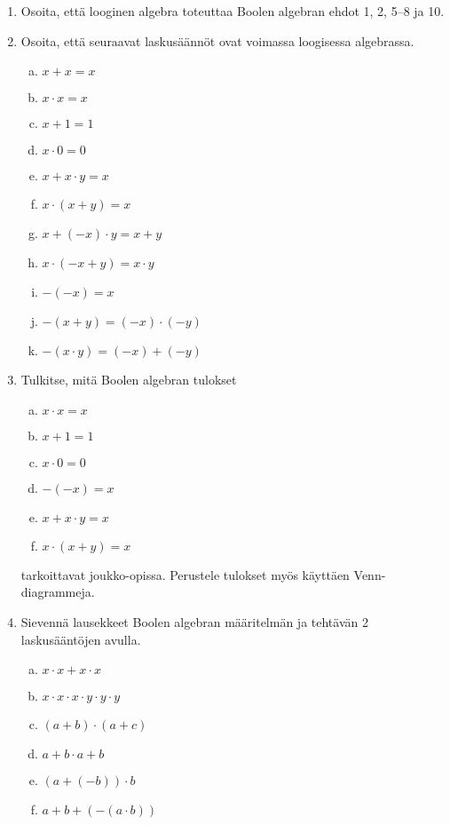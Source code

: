 \begin{enumerate}

\item Osoita, että looginen algebra toteuttaa Boolen algebran ehdot 1, 2, 5--8 ja 10.

\item Osoita, että seuraavat laskusäännöt ovat voimassa loogisessa algebrassa.
\begin{enumerate}[a)]
\item $x + x = x$
\item $x \cdot x = x$
\item $x + 1 = 1$
\item $x \cdot 0 = 0$
\item $x + x \cdot y = x$
\item $x \cdot (x + y) = x$
\item $x + (-x) \cdot y = x + y$
\item $x \cdot (-x + y) = x \cdot y$
\item $-(-x) = x$
\item $-(x + y) = (-x) \cdot (-y)$
\item $-(x \cdot y) = (-x) + (-y)$
\end{enumerate}

\item
Tulkitse, mitä Boolen algebran tulokset
\begin{enumerate}[a)]
\item $x \cdot x = x$
\item $x + 1 = 1$
\item $x \cdot 0 = 0$
\item $-(-x) = x$
\item $x + x \cdot y = x$
\item $x \cdot (x + y) = x$
\end{enumerate}
tarkoittavat joukko-opissa. Perustele tulokset myös käyttäen Venn-diagrammeja.

\item
Sievennä lausekkeet Boolen algebran määritelmän ja tehtävän 2 laskusääntöjen avulla.
\begin{enumerate}[a)]
\item $x \cdot x + x \cdot x$
\item $x \cdot x \cdot x \cdot y \cdot y \cdot y$
\item $(a + b) \cdot (a + c)$
\item $a + b \cdot a + b$
\item $(a + (-b)) \cdot b$
\item $a + b + (-(a \cdot b))$
\end{enumerate}


\end{enumerate}
